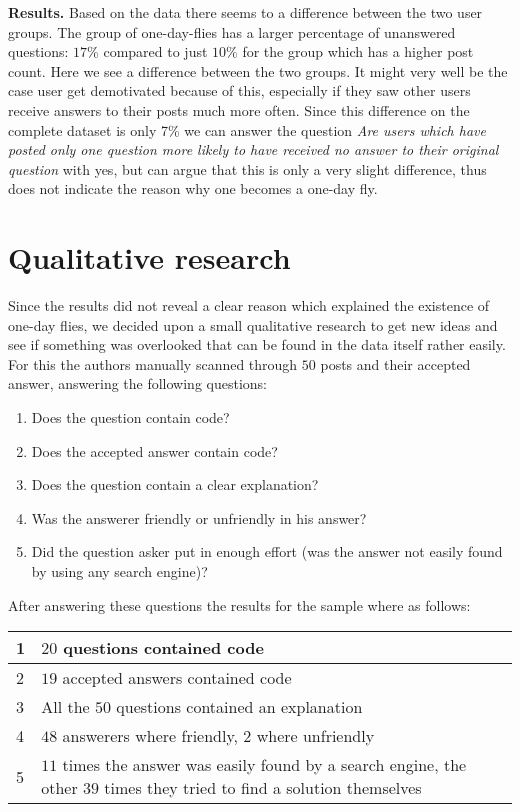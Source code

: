 \documentclass[conference]{IEEEtran}
\begin{document}
\textbf{Results.} Based on the data there seems to a difference between the two user groups. The
group of one-day-flies has a larger percentage of unanswered questions: $17\%$
compared to just $10\%$ for the group which has a higher post count. Here we
see a  difference between the two groups. It might very well be the case user
get demotivated because of this, especially if they saw other users receive
answers to their posts much more often. Since this difference on the complete
dataset is only 7\% we can answer the question \textit{Are users which have
posted only one question more likely to have received no answer to their
original question} with yes, but can argue that this is only a very slight
difference, thus does not indicate the reason why one becomes a one-day fly.



\section{Qualitative research}\label{QualitativeResearch}
Since the results did not reveal a clear reason which explained the existence
of one-day flies, we decided upon a small qualitative research to get new ideas
and see if something was overlooked that can be found in the data itself rather
easily.  For this the authors manually scanned through $50$ posts and their
accepted answer, answering the following questions:

\begin{enumerate}
\item Does the question contain code?
\item Does the accepted answer contain code?
\item Does the question contain a clear explanation?
\item Was the answerer friendly or unfriendly in his answer?
\item Did the question asker put in enough effort (was the answer not easily
found by using any search engine)?  
\end{enumerate}

After answering these questions the results for the sample where as follows:
\newline
\newline
\begin{tabular}{ | l | p{8cm} | }
\hline
  1 & $20$ questions contained code \\
\hline
  2 & $19$ accepted answers contained code \\
\hline
  3 & All the $50$ questions contained an explanation \\
\hline
  4 & $48$ answerers where friendly, $2$ where unfriendly \\
\hline
  5 & $11$ times the answer was easily found by a search engine, the other $39$ times they tried to find a solution themselves \\
\hline
\end{tabular}
\newline
\newline
\end{document}
